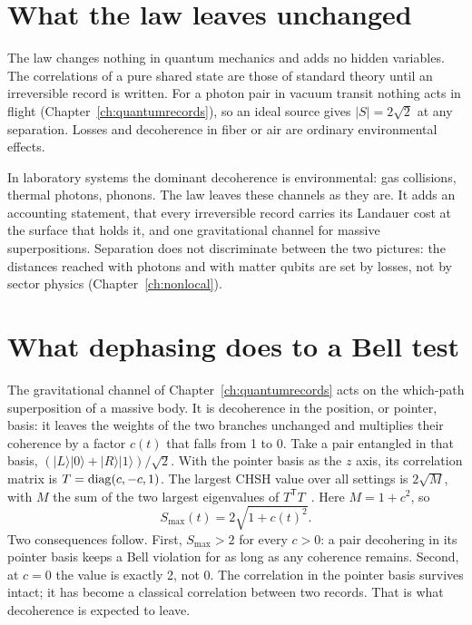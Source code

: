 \section{What the law leaves unchanged}\label{sec:ent:unchanged}
The law changes nothing in quantum mechanics and adds no hidden variables. The correlations of a pure shared state are those of standard theory until
an irreversible record is written. For a photon pair in vacuum transit nothing acts in flight (Chapter~\ref{ch:quantumrecords}), so an ideal source
gives $|S|=2\sqrt2$ at any separation. Losses and decoherence in fiber or air are ordinary environmental effects. \derived

In laboratory systems the dominant decoherence is environmental: gas collisions, thermal photons, phonons. The law leaves these channels as they are.
It adds an accounting statement, that every irreversible record carries its Landauer cost at the surface that holds it, and one gravitational channel
for massive superpositions. \interp{} Separation does not discriminate between the two pictures: the distances reached with photons and with matter qubits are
set by losses, not by sector physics (Chapter~\ref{ch:nonlocal}). \observed

\section{What dephasing does to a Bell test}\label{sec:ent:dephasing}
The gravitational channel of Chapter~\ref{ch:quantumrecords} acts on the which-path superposition of a massive body. It is decoherence in the position, or
pointer, basis: it leaves the weights of the two branches unchanged and multiplies their coherence by a factor $c(t)$ that falls from 1 to 0.
Take a pair entangled in that basis, $(|L\rangle|0\rangle+|R\rangle|1\rangle)/\sqrt2$. With the pointer basis as the $z$ axis, its correlation matrix
is $T={\rm diag}(c,-c,1)$. The largest CHSH value over all settings is $2\sqrt{M}$, with $M$ the sum of the two largest eigenvalues of
$T^{\mathsf T}T$~\cite{Horodecki1995}. Here $M=1+c^2$, so
\begin{equation}
S_{\max}(t)=2\sqrt{1+c(t)^2}.\label{eq:ent:smax}
\end{equation}
\derived{} Two consequences follow. First, $S_{\max}>2$ for every $c>0$: a pair decohering in its pointer basis keeps a Bell violation for as long as
any coherence remains. Second, at $c=0$ the value is exactly 2, not 0. The correlation in the pointer basis survives intact; it has become a classical
correlation between two records. That is what decoherence is expected to leave.

